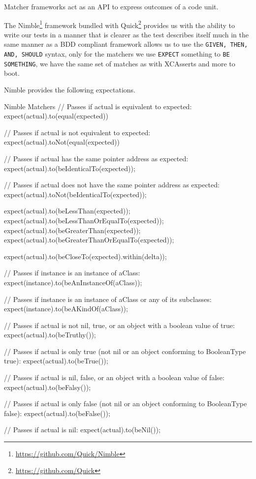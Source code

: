 \documentclass[a4paper, titlepage]{article}
\begin{document}
Matcher frameworks act as an API to express outcomes of a code unit.

The Nimble\footnote{\url{https://github.com/Quick/Nimble}}  framework
bundled with Quick\footnote{\url{https://github.com/Quick}} provides 
us with the ability to write our tests in a manner that is clearer as the
test describes itself much in the same manner as a BDD compliant
framework allows us to use the \texttt{GIVEN, THEN, AND, SHOULD} syntax, only for
the matchers we use \texttt{EXPECT} something to \texttt{BE SOMETHING},
we have the same set of matches as with XCAsserts and more to boot.

Nimble provides the following expectations.
\begin{listbox}{1}{Nimble Matchers}
// Passes if actual is equivalent to expected:
expect(actual).to(equal(expected))

// Passes if actual is not equivalent to expected:
expect(actual).toNot(equal(expected))

// Passes if actual has the same pointer address as expected:
expect(actual).to(beIdenticalTo(expected));

// Passes if actual does not have the same pointer address as expected:
expect(actual).toNot(beIdenticalTo(expected));

expect(actual).to(beLessThan(expected));
expect(actual).to(beLessThanOrEqualTo(expected));
expect(actual).to(beGreaterThan(expected));
expect(actual).to(beGreaterThanOrEqualTo(expected));

expect(actual).to(beCloseTo(expected).within(delta));

// Passes if instance is an instance of aClass:
expect(instance).to(beAnInstanceOf(aClass));

// Passes if instance is an instance of aClass or any of its subclasses:
expect(instance).to(beAKindOf(aClass));

// Passes if actual is not nil, true, or an object with a boolean value of true:
expect(actual).to(beTruthy());

// Passes if actual is only true (not nil or an object conforming to BooleanType true):
expect(actual).to(beTrue());

// Passes if actual is nil, false, or an object with a boolean value of false:
expect(actual).to(beFalsy());

// Passes if actual is only false (not nil or an object conforming to BooleanType false):
expect(actual).to(beFalse());

// Passes if actual is nil:
expect(actual).to(beNil());


\end{listbox}
\end{document}
